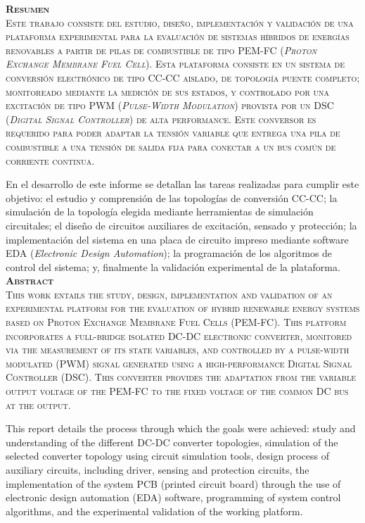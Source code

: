 \huge
\scshape
\textbf{Resumen}\\

\normalfont\normalsize
Este trabajo consiste del estudio, diseño, implementación y validación de una plataforma experimental para la evaluación de sistemas híbridos de energías renovables a partir de pilas de combustible de tipo PEM-FC (\textit{Proton Exchange Membrane Fuel Cell}). Esta plataforma consiste en un sistema de conversión electrónico de tipo CC-CC aislado, de topología puente completo; monitoreado mediante la medición de sus estados, y controlado por una excitación de tipo PWM (\textit{Pulse-Width Modulation}) provista por un DSC (\textit{Digital Signal Controller}) de alta performance. Este conversor es requerido para poder adaptar la tensión variable que entrega una pila de combustible a una tensión de salida fija para conectar a un bus común de corriente continua. 

En el desarrollo de este informe se detallan las tareas realizadas para cumplir este objetivo: el estudio y comprensión de las topologías de conversión CC-CC; la simulación de la topología elegida mediante herramientas de simulación circuitales; el diseño de circuitos auxiliares de excitación, sensado y protección; la implementación del sistema en una placa de circuito impreso mediante software EDA (\textit{Electronic Design Automation}); la programación de los algoritmos de control del sistema; y, finalmente la validación experimental de la plataforma.\\

\vspace{1cm}
\huge
\scshape
\textbf{Abstract}\\

\normalsize\normalfont
This work entails the study, design, implementation and validation of an experimental platform for the evaluation of hybrid renewable energy systems based on Proton Exchange Membrane Fuel Cells (PEM-FC). This platform incorporates a full-bridge isolated DC-DC electronic converter, monitored via the measurement of its state variables, and controlled by a pulse-width modulated (PWM) signal generated using a high-performance Digital Signal Controller (DSC). This converter provides the adaptation from the variable output voltage of the PEM-FC to the fixed voltage of the common DC bus at the output.

This report details the process through which the goals were achieved: study and understanding of the different DC-DC converter topologies, simulation of the selected converter topology using circuit simulation tools, design process of auxiliary circuits, including driver, sensing and protection circuits, the implementation of the system PCB (printed circuit board) through the use of electronic design automation (EDA) software, programming of system control algorithms, and the experimental validation of the working platform.\\ 